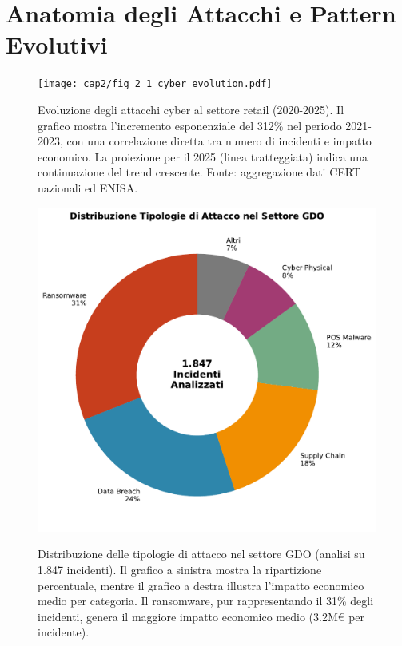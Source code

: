 \section{Anatomia degli Attacchi e Pattern Evolutivi}

\begin{figure}[htbp]
\centering
\texttt{[image: cap2/fig\_2\_1\_cyber\_evolution.pdf]}
\caption{Evoluzione degli attacchi cyber al settore retail (2020-2025). Il grafico mostra l'incremento esponenziale del 312\% nel periodo 2021-2023, con una correlazione diretta tra numero di incidenti e impatto economico. La proiezione per il 2025 (linea tratteggiata) indica una continuazione del trend crescente. Fonte: aggregazione dati CERT nazionali ed ENISA.}
\label{fig:cyber_evolution}
\end{figure}

\begin{figure}[htbp]
\centering
\includegraphics[width=\textwidth]{thesis_figures/cap2/fig_2_2_attack_types.pdf}
\caption{Distribuzione delle tipologie di attacco nel settore GDO (analisi su 1.847 incidenti). Il grafico a sinistra mostra la ripartizione percentuale, mentre il grafico a destra illustra l'impatto economico medio per categoria. Il ransomware, pur rappresentando il 31\% degli incidenti, genera il maggiore impatto economico medio (3.2M€ per incidente).}\autocite{CPR2025}
\label{fig:attack_types}
\end{figure}

